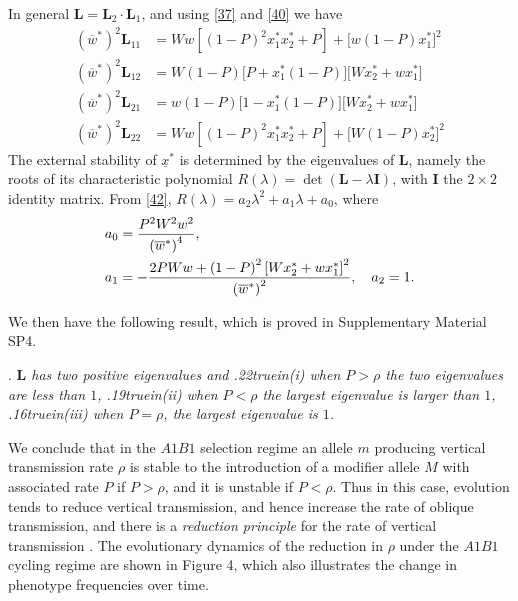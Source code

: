 \documentclass[9pt,twocolumn,twoside,lineno]{pnas-new}
\newcommand{\cl}{\mathbf{L}}
\newcommand{\ci}{\mathbf{I}}
\newcommand{\an}[1]{\begin{align}#1\end{align}}
\begin{document}
 In general $\cl=\cl_2\cdot\cl_1$, and using \eqref{37} and \eqref{40} we have
  \begin{equation}
  \an{
 \left(\overline w^*\right)^2\cl_{11} &=Ww\left[(1-P)^2x_1^*x_2^* +P\right] +\bigl[w(1-P)x_1^*\bigr]^2 \\
 \left(\overline w^*\right)^2\cl_{12} &=W(1-P)\bigl[P+x_1^*(1-P)\bigr]\bigl[Wx_2^* +wx_1^*\bigr]\\
 \left(\overline w^*\right)^2\cl_{21} &=w(1-P)\bigl[1-x_1^*(1-P)\bigr]\bigl[Wx_2^* +wx_1^*\bigr]\\
 \left(\overline w^*\right)^2\cl_{22} &= Ww\left[(1-P)^2x_1^*x_2^* +P\right] +\bigl[W(1-P)x_2^*\bigr]^2
 }
 \label{42}\end{equation}
 The external stability of $\underline x^*$ is determined by the eigenvalues of $\cl$, namely the roots of its characteristic polynomial $R(\lambda) =\det(\cl-\lambda\ci)$, with $\ci$ the $2\times 2$ identity matrix. From \eqref{42}, $R(\lambda)=a_2\lambda^2 +a_1\lambda +a_0$, where
 \begin{equation}
 \an{
 &a_0={P^2W^2w^2\over\left(\overline w^*\right)^4},\\
 & a_1=-{2PWw +\left(1-P\right)^2\left[Wx_2^* +wx_1^*\right]^2\over \left(\overline w^*\right)^2},\quad a_2=1.}
 \label{43}\end{equation}
 

We then have the following result, which is proved in Supplementary Material SP4.
 \medskip
 
 . {\sl $\cl$ has two positive eigenvalues and\hfil\break
  {\hglue.22truein}(i) when $P>\rho$ the two eigenvalues are less than $1$,\hfil\break
  {\hglue.19truein}(ii) when $P<\rho$ the largest eigenvalue is larger than $1$,\hfil\break
  {\hglue.16truein}(iii) when $P=\rho$, the largest eigenvalue is $1$.}\par
  \medskip

 We conclude that in the $A1B1$ selection regime an allele $m$ producing vertical transmission rate $\rho$ is stable to the introduction of a modifier allele $M$ with associated rate $P$ if $P>\rho$, and it is unstable if $P<\rho$. Thus in this case, evolution tends to reduce vertical transmission, and hence increase the rate of oblique transmission,  and there is a {\sl reduction principle} for the rate of vertical transmission \cite{feldman1986evolutionary,altenberg2017unified}. The evolutionary dynamics of the reduction in $\rho$ under the $A1B1$ cycling regime are shown in Figure 4, which also illustrates the change in phenotype frequencies over time. 
 
\end{document}
